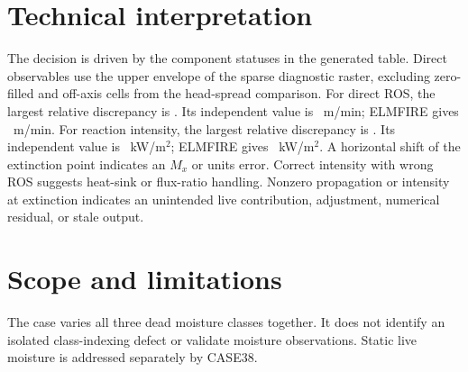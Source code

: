 \section{Technical interpretation}
The \VerificationStatus{} decision is driven by the component statuses in the generated table. Direct observables use the upper envelope of the sparse diagnostic raster, excluding zero-filled and off-axis cells from the head-spread comparison. For direct ROS, the largest relative discrepancy is \WorstRosRelativeError{}. Its independent value is \WorstRosExpected{}~m/min; ELMFIRE gives \WorstRosMeasured{}~m/min. For reaction intensity, the largest relative discrepancy is \WorstIrRelativeError{}. Its independent value is \WorstIrExpected{}~kW/m$^2$; ELMFIRE gives \WorstIrMeasured{}~kW/m$^2$. A horizontal shift of the extinction point indicates an $M_x$ or units error. Correct intensity with wrong ROS suggests heat-sink or flux-ratio handling. Nonzero propagation or intensity at extinction indicates an unintended live contribution, adjustment, numerical residual, or stale output.

\section{Scope and limitations}
The case varies all three dead moisture classes together.  It does not identify an isolated class-indexing defect or validate moisture observations.  Static live moisture is addressed separately by CASE38.
